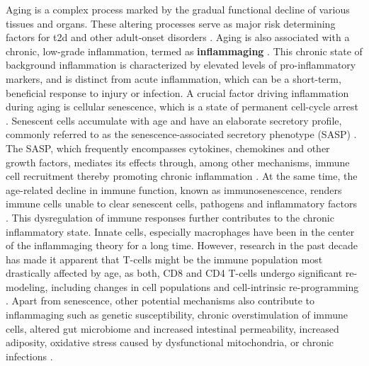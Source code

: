 Aging is a complex process marked by the gradual functional decline of various tissues and organs. These altering processes serve as major risk determining factors for \gls{t2d} and other adult-onset disorders \textbf{\cite{sandovici_ageing_2016,tuduri_pancreatic_2022}}. Aging is also associated with a chronic, low-grade inflammation, termed as \textbf{inflammaging} \textbf{\cite{frasca_aging_2017,franceschi_inflamm-aging_2000}}. This chronic state of background inflammation is characterized by elevated levels of pro-inflammatory markers, and is distinct from acute inflammation, which can be a short-term, beneficial response to injury or infection. A crucial factor driving inflammation during aging is cellular senescence, which is a state of permanent cell-cycle arrest \textbf{\cite{ren_inflammatory_2009}}. Senescent cells accumulate with age and have an elaborate secretory profile, commonly referred to as the senescence-associated secretory phenotype (SASP) \textbf{\cite{gorgoulis_cellular_2019}}. The SASP, which frequently encompasses cytokines, chemokines and other growth factors, mediates its effects through, among other mechanisms, immune cell recruitment thereby promoting chronic inflammation \textbf{\cite{gorgoulis_cellular_2019}}. At the same time, the age-related decline in immune function, known as immunosenescence, renders immune cells unable to clear senescent cells, pathogens and inflammatory factors \textbf{\cite{sanada_source_2018}}. This dysregulation of immune responses further contributes to the chronic inflammatory state. Innate cells, especially macrophages have been in the center of the inflammaging theory for a long time. However, research in the past decade has made it apparent that T-cells might be the immune population most drastically affected by age, as both, CD8 and CD4 T-cells undergo significant re-modeling, including changes in cell populations and cell-intrinsic re-programming \textbf{\cite{shchukina_t_2023}}. Apart from senescence, other potential mechanisms also contribute to inflammaging such as genetic susceptibility, chronic overstimulation of immune cells, altered gut microbiome and increased intestinal permeability, increased adiposity, oxidative stress caused by dysfunctional mitochondria, or chronic infections \textbf{\cite{frasca_aging_2017,ferrucci_inflammageing_2018,frasca_inflammaging_2016}}.\\

